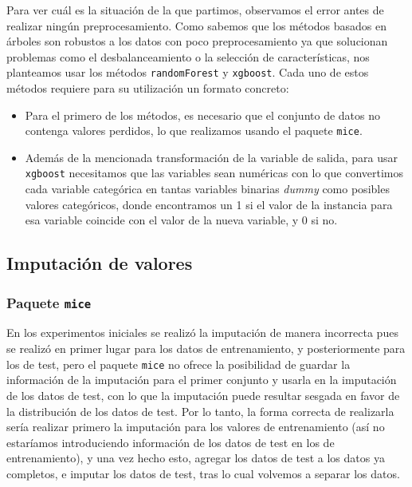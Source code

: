 \documentclass[11pt]{article}
\begin{document}
Para ver cuál es la situación de la que partimos, observamos el error
antes de realizar ningún preprocesamiento.  Como sabemos que los
métodos basados en árboles son robustos a los datos con poco
preprocesamiento ya que solucionan problemas como el desbalanceamiento
o la selección de características, nos planteamos usar los métodos
\texttt{randomForest} y \texttt{xgboost}. Cada uno de estos métodos requiere para su
utilización un formato concreto:

\begin{itemize}
\item Para el primero de los métodos, es necesario que el conjunto de
datos no contenga valores perdidos, lo que realizamos usando el
paquete \texttt{mice}.
\item Además de la mencionada transformación de la variable de salida,
para usar \texttt{xgboost} necesitamos que las variables sean numéricas con
lo que convertimos cada variable categórica en tantas variables
binarias \emph{dummy} como posibles valores categóricos, donde
encontramos un 1 si el valor de la instancia para esa variable
coincide con el valor de la nueva variable, y 0 si no.
\end{itemize}


\subsection{Imputación de valores}
\label{sec:orgee4efb0}

\subsubsection{Paquete \texttt{mice}}
\label{sec:org608f3fa}

En los experimentos iniciales se realizó la imputación de manera
incorrecta pues se realizó en primer lugar para los datos de
entrenamiento, y posteriormente para los de test, pero el paquete
\texttt{mice} no ofrece la posibilidad de guardar la información de la
imputación para el primer conjunto y usarla en la imputación de los
datos de test, con lo que la imputación puede resultar sesgada en
favor de la distribución de los datos de test. Por lo tanto, la forma
correcta de realizarla sería realizar primero la imputación para los
valores de entrenamiento (así no estaríamos introduciendo información
de los datos de test en los de entrenamiento), y una vez hecho esto,
agregar los datos de test a los datos ya completos, e imputar los
datos de test, tras lo cual volvemos a separar los datos. 
\end{document}
